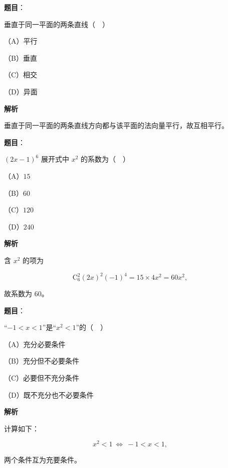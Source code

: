 \begin{answer}

\textbf{题目}：

垂直于同一平面的两条直线（　）

（A）平行

（B）垂直

（C）相交

（D）异面

\textbf{解析}

垂直于同一平面的两条直线方向都与该平面的法向量平行，故互相平行。


\end{answer}
\begin{answer}

\textbf{题目}：

$(2x-1)^6$ 展开式中 $x^2$ 的系数为（　）

（A）$15$

（B）$60$

（C）$120$

（D）$240$

\textbf{解析}

含 $x^2$ 的项为

\nopagebreak[4]
\[\mathrm C_6^2(2x)^2(-1)^4=15\times4x^2=60x^2,\]

故系数为 $60$。


\end{answer}
\begin{answer}

\textbf{题目}：

“$-1<x<1$”是“$x^2<1$”的（　）

（A）充分必要条件

（B）充分但不必要条件

（C）必要但不充分条件

（D）既不充分也不必要条件

\textbf{解析}

计算如下：

\nopagebreak[4]
\[x^2<1\ \Longleftrightarrow\ -1<x<1,\]

两个条件互为充要条件。


\end{answer}
